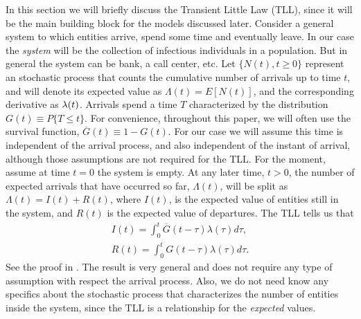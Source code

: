 \documentclass[USenglish,10pt]{article}
\newcommand{\Gb}{\overline{G}\xspace}
\newcommand{\la}{\ensuremath\lambda\xspace}
\begin{document}
In this section we will briefly discuss the Transient Little Law (TLL)\cite{fral.ea:tll}, since it will be the main building block for the models discussed later.
Consider a general system to which entities arrive, spend some time and eventually leave. In our case the \emph{system} will be the collection of infectious individuals in a population.
But in general the system can be bank, a call center, etc. Let $\{N(t),t\geq 0\}$ represent an stochastic process that counts the cumulative number of arrivals  up to time $t$, and will denote its expected value as $\Lambda(t)=E[N(t)]$, and the corresponding derivative as $\la(t)$.
Arrivals spend a time $T$ characterized by the distribution  $G(t) \equiv P\{T\leq t\}$.
For convenience, throughout this paper, we will often use the survival function, $\Gb(t) \equiv 1-G(t)$.
For our case we will assume this time is independent of the arrival process, and also independent of the instant of arrival, although those assumptions are not required for the TLL.
For the moment, assume at time $t=0$ the system is empty. At any later time, $t>0$, the number of expected arrivals that have occurred so far, $\Lambda(t)$, will be split as $\Lambda(t)=I(t)+R(t)$, where  $I(t)$, is the expected value of entities still in the system, and  $R(t)$ is the expected value of departures. The TLL tells us that
\begin{align}
I(t) = \int_0^t \Gb(t-\tau) \lambda(\tau)d\tau,   \label{eq:tll0_i} \\
R(t) = \int_0^t G(t-\tau)  \lambda(\tau)d\tau .  \label{eq:tll0_r}
\end{align}
See the proof in \cite{fral.ea:tll}.
The result is very general and does not require any type of assumption with respect the arrival process.
Also, we do not need know any specifics about the stochastic process that characterizes the number of entities inside the system, since the TLL is a relationship for the \emph{expected} values.
\end{document}
